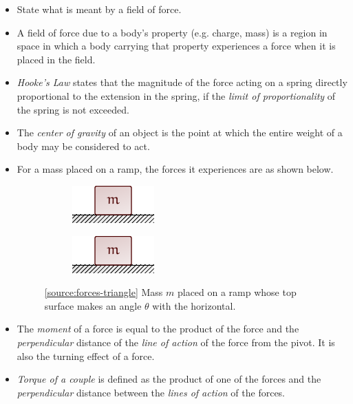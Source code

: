 \documentclass[oneside]{book}
\begin{document}
\begin{itemize}
    \item State what is meant by a field of force. 
    \item A field of force due to a body's property (e.g. charge, mass) is a region in space in which a body carrying that property experiences a force when it is placed in the field.
    \item \emph{Hooke's Law} states that the magnitude of the force acting on a spring directly proportional to the extension in the spring, if the \emph{limit of proportionality} of the spring is not exceeded.
    \item The \emph{center of gravity} of an object is the point at which the entire weight of a body may be considered to act.
    \item For a mass placed on a ramp, the forces it experiences are as shown below.
    \begin{figure}[H]
        \centering
        \begin{subfigure}[c]{0.3\textwidth}
            \centering
            \includegraphics[page=4]{../images/Force-Triangle/Force-Triangle.pdf}
        \end{subfigure}%
        \begin{subfigure}[c]{0.3\textwidth}
            \centering
            \includegraphics[page=5]{../images/Force-Triangle/Force-Triangle.pdf}
        \end{subfigure}%
        \caption{\ref{source:forces-triangle} Mass \(m\) placed on a ramp whose top surface makes an angle \(\theta\) with the horizontal.}
        \label{fig:forces-triangle}
    \end{figure}
    \item The \emph{moment} of a force is equal to the product of the force and the \emph{perpendicular} distance of the \emph{line of action} of the force from the pivot. It is also the turning effect of a force.
    \item \emph{Torque of a couple} is defined as the product of one of the forces and the \emph{perpendicular} distance between the \emph{lines of action} of the forces.

\end{itemize}
\end{document}
